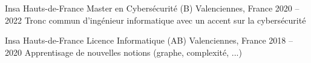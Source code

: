 
\begin{cventries}
  \cventry
    {Insa Hauts-de-France} %
    {Master en Cybersécurité (B)} %
    {Valenciennes, France} %
    {2020 – 2022} %
    {Tronc commun d'ingénieur informatique avec un accent sur la cybersécurité}
    
  \cventry
    {Insa Hauts-de-France} %
    {Licence Informatique (AB)} %
    {Valenciennes, France} %
    {2018 – 2020} %
    {Apprentisage de nouvelles notions (graphe, complexité, ...)}

\end{cventries}
